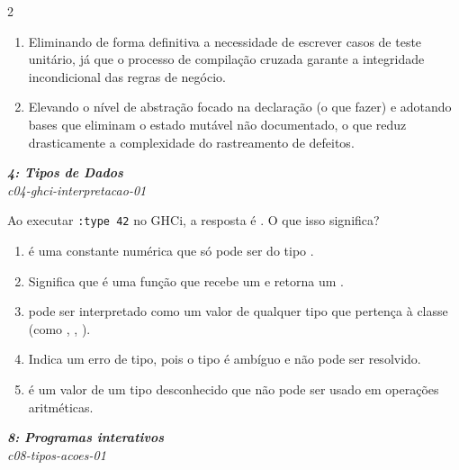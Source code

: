 \documentclass[a4paper,10pt,brazil]{article}
\begin{document}
\begin{multicols}{2}
\begin{enumerate}
  \item Eliminando de forma definitiva a necessidade de escrever casos de teste unitário, já que o processo de compilação cruzada garante a integridade incondicional das regras de negócio.

  \item Elevando o nível de abstração focado na declaração (o que fazer) e adotando bases que eliminam o estado mutável não documentado, o que reduz drasticamente a complexidade do rastreamento de defeitos.


\end{enumerate}

\begin{flushright}
  \footnotesize
  \textit{\textbf{4: Tipos de Dados}}\\
  \textit{c04-ghci-interpretacao-01}\\

\end{flushright}
Ao executar \texttt{:type 42} no GHCi, a resposta é . O que isso significa?

\begin{enumerate}
  \item {} é uma constante numérica que só pode ser do tipo .

  \item Significa que  é uma função que recebe um  e retorna um .

  \item {} pode ser interpretado como um valor de qualquer tipo que pertença à classe  (como , , ).

  \item Indica um erro de tipo, pois o tipo é ambíguo e não pode ser resolvido.

  \item {} é um valor de um tipo desconhecido que não pode ser usado em operações aritméticas.


\end{enumerate}

\begin{flushright}
  \footnotesize
  \textit{\textbf{8: Programas interativos}}\\
  \textit{c08-tipos-acoes-01}\\


\end{flushright}
\end{multicols}
\end{document}
